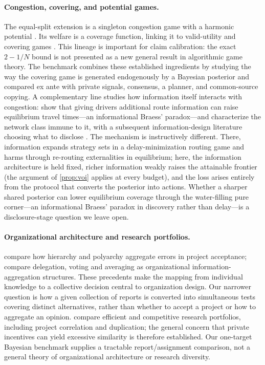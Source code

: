 \documentclass[11pt]{article}
\theoremstyle{definition}
\theoremstyle{remark}
\newcommand{\1}{\mathbf{1}}
\begin{document}
\paragraph{Congestion, covering, and potential games.}
The equal-split extension is a singleton congestion game with a harmonic potential \citep{Rosenthal1973,MondererShapley1996}. Its welfare is a coverage function, linking it to valid-utility and covering games \citep{Vetta2002,Gairing2009}. This lineage is important for claim calibration: the exact $2-1/N$ bound is not presented as a new general result in algorithmic game theory. The benchmark combines these established ingredients by studying the way the covering game is generated endogenously by a Bayesian posterior and compared ex ante with private signals, consensus, a planner, and common-source copying. A complementary line studies how information itself interacts with congestion: \citet{AcemogluEtAl2018} show that giving drivers additional route information can raise equilibrium travel times---an informational Braess' paradox---and characterize the network class immune to it, with a subsequent information-design literature choosing what to disclose \citep{DasKamenicaMirka2017}. The mechanism is instructively different. There, information expands strategy sets in a delay-minimization routing game and harms through re-routing externalities in equilibrium; here, the information architecture is held fixed, richer information weakly raises the attainable frontier (the argument of \cref{prop:voi} applies at every budget), and the loss arises entirely from the protocol that converts the posterior into actions. Whether a sharper shared posterior can lower equilibrium coverage through the water-filling pure corner---an informational Braess' paradox in discovery rather than delay---is a disclosure-stage question we leave open.

\paragraph{Organizational architecture and research portfolios.}
\citet{SahStiglitz1986} compare how hierarchy and polyarchy aggregate errors in project acceptance; \citet{CsaszarEggers2013} compare delegation, voting and averaging as organizational information-aggregation structures. These precedents make the mapping from individual knowledge to a collective decision central to organization design. Our narrower question is how a given collection of reports is converted into simultaneous tests covering distinct alternatives, rather than whether to accept a project or how to aggregate an opinion. \citet{DasguptaMaskin1987} compare efficient and competitive research portfolios, including project correlation and duplication; the general concern that private incentives can yield excessive similarity is therefore established. Our one-target Bayesian benchmark supplies a tractable report/assignment comparison, not a general theory of organizational architecture or research diversity.
\end{document}
